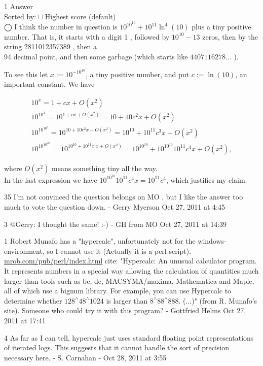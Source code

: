 \documentclass[10pt]{article}
\begin{document}
1 Answer\\
Sorted by: □ Highest score (default)\\
◯ I think the number in question is $10^{10^{10}}+10^{11} \ln ^{4}(10)$ plus a tiny positive number. That is, it starts with a digit 1 , followed by $10^{10}-13$ zeros, then by the string 2811012357389 , then a\\
94 decimal point, and then some garbage (which starts like $4407116278 \ldots$ ).

To see this let $x:=10^{-10^{10}}$, a tiny positive number, and put $c:=\ln (10)$, an important constant. We have

$$
\begin{gathered}
10^{x}=1+c x+O\left(x^{2}\right) \\
10^{10^{x}}=10^{1+c x+O\left(x^{2}\right)}=10+10 c^{2} x+O\left(x^{2}\right) \\
10^{10^{10^{x}}}=10^{10+10 c^{2} x+O\left(x^{2}\right)}=10^{10}+10^{11} c^{3} x+O\left(x^{2}\right) \\
10^{10^{10^{10^{x}}}}=10^{10^{10}+10^{11} c^{3} x+O\left(x^{2}\right)}=10^{10^{10}}+10^{10^{10}} 10^{11} c^{4} x+O\left(x^{2}\right),
\end{gathered}
$$

where $O\left(x^{2}\right)$ means something tiny all the way.\\
In the last expression we have $10^{10^{10}} 10^{11} c^{4} x=10^{11} c^{4}$, which justifies my claim.

35 I'm not convinced the question belongs on MO , but I like the answer too much to vote the question down. - Gerry Myerson Oct 27, 2011 at 4:45

3 @Gerry: I thought the same! :-) - GH from MO Oct 27, 2011 at 14:39

1 Robert Munafo has a "hypercalc", unfortunately not for the windows-environment, so I cannot use it (Actually it is a perl-script). \href{http://mrob.com/pub/perl/index.html}{mrob.com/pub/perl/index.html} cite: "Hypercalc: An unusual calculator program. It represents numbers in a special way allowing the calculation of quantities much larger than tools such as bc, dc, MACSYMA/maxima, Mathematica and Maple, all of which use a bignum library. For example, you can use Hypercalc to determine whether $128^{\wedge} 48^{\wedge} 1024$ is larger than $8^{\wedge} 88^{\wedge} 888$. (...)" (from R. Munafo's site). Someone who could try it with this program? - Gottfried Helms Oct 27, 2011 at 17:41

4 As far as I can tell, hypercalc just uses standard floating point representations of iterated logs. This suggests that it cannot handle the sort of precision necessary here. - S. Carnahan - Oct 28, 2011 at 3:55
\end{document}
